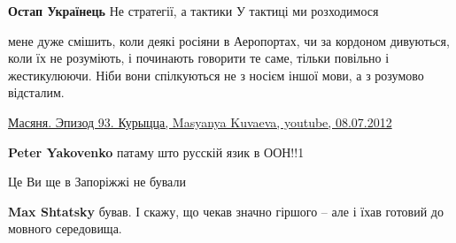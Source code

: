 \begin{itemize}
\begin{itemize}
\textbf{Остап Українець} Не стратегії, а тактики \Smiley[1.0][yellow] У тактиці ми розходимося \Smiley[1.0][yellow]

\end{itemize}

 
мене дуже смішить, коли деякі росіяни в Аеропортах, чи за кордоном дивуються,
коли їх не розуміють, і починають говорити те саме, тільки повільно і
жестикулюючи. Ніби вони спілкуються не з носієм іншої мови, а з розумово
відсталим.

\href{https://www.youtube.com/watch?v=Lw4WFBzT1Kc}{%
Масяня. Эпизод 93. Курыцца, Masyanya Kuvaeva, youtube, 08.07.2012%
}

\begin{itemize}
 
\textbf{Peter Yakovenko} патаму што русскій язик в ООН!!1
\end{itemize}

 
Це Ви ще в Запоріжжі не бували

\begin{itemize}
 
\textbf{Max Shtatsky} бував. І скажу, що чекав значно гіршого – але і їхав готовий до мовного середовища.

 

\end{itemize}
\end{itemize}
